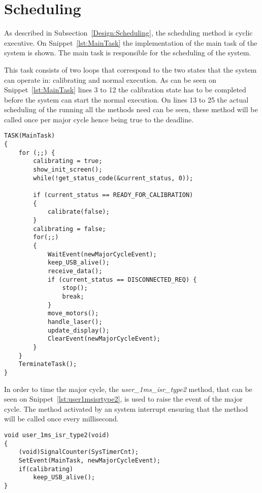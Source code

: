 \section{Scheduling}\label{solution:scheduling}
As described in Subsection~\ref{Design:Scheduling}, the scheduling method is cyclic executive. 
On Snippet~\ref{lst:MainTask} the implementation of the main task of the system is shown. 
The main task is responsible for the scheduling of the system.

This task consists of two loops that correspond to the two states that the system can operate in: calibrating and normal execution.
As can be seen on Snippet~\ref{lst:MainTask} lines 3 to 12 the calibration state has to be completed before the system can start the normal execution. 
On lines 13 to 25 the actual scheduling of the running all the methods need can be seen, these method will be called once per major cycle hence being true to the deadline. 

\begin{lstlisting}[language=CSharp,label={lst:MainTask},caption={MainTaks method from logic.c}]
TASK(MainTask)
{
    for (;;) {
        calibrating = true;
        show_init_screen();
        while(!get_status_code(&current_status, 0));

        if (current_status == READY_FOR_CALIBRATION)
        {
            calibrate(false);
        }
        calibrating = false;
        for(;;)
        {
            WaitEvent(newMajorCycleEvent);
            keep_USB_alive();
            receive_data();
            if (current_status == DISCONNECTED_REQ) {
                stop();
                break;
            }
            move_motors();
            handle_laser();
            update_display();
            ClearEvent(newMajorCycleEvent); 
        }
    }
    TerminateTask();
}
\end{lstlisting}

In order to time the major cycle, the \textit{user\_1ms\_isr\_type2} method, that can be seen on Snippet~\ref{lst:user1msisrtype2}, is used to raise the event of the major cycle. 
The method activated by an system interrupt ensuring that the method will be called once every millisecond. 
\begin{lstlisting}[language=CSharp,label={lst:user1msisrtype2},caption={user\_1ms\_isr\_type2 method from nxt.c}]
void user_1ms_isr_type2(void)
{
    (void)SignalCounter(SysTimerCnt);
    SetEvent(MainTask, newMajorCycleEvent);
    if(calibrating)
        keep_USB_alive();
}
\end{lstlisting}

